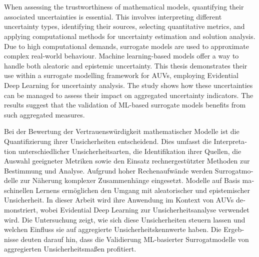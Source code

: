 \chapter{\abstractname}

When assessing the trustworthiness of mathematical models, quantifying their associated uncertainties is essential. This involves interpreting different uncertainty types, identifying their sources, selecting quantitative metrics, and applying computational methods for uncertainty estimation and solution analysis. Due to high computational demands, surrogate models are used to approximate complex real-world behaviour. Machine learning-based models offer a way to handle both aleatoric and epistemic uncertainty. This thesis demonstrates their use within a surrogate modelling framework for AUVs, employing Evidential Deep Learning for uncertainty analysis. The study shows how these uncertainties can be managed to assess their impact on aggregated uncertainty indicators. The results suggest that the validation of ML-based surrogate models benefits from such aggregated measures. \newline

\begin{otherlanguage}{ngerman}
Bei der Bewertung der Vertrauenswürdigkeit mathematischer Modelle ist die Quantifizierung ihrer Unsicherheiten entscheidend. Dies umfasst die Interpretation unterschiedlicher Unsicherheitsarten, die Identifikation ihrer Quellen, die Auswahl geeigneter Metriken sowie den Einsatz rechnergestützter Methoden zur Bestimmung und Analyse. Aufgrund hoher Rechenaufwände werden Surrogatmodelle zur Näherung komplexer Zusammenhänge eingesetzt. Modelle auf Basis maschinellen Lernens ermöglichen den Umgang mit aleatorischer und epistemischer Unsicherheit. In dieser Arbeit wird ihre Anwendung im Kontext von AUVs demonstriert, wobei Evidential Deep Learning zur Unsicherheitsanalyse verwendet wird. Die Untersuchung zeigt, wie sich diese Unsicherheiten steuern lassen und welchen Einfluss sie auf aggregierte Unsicherheitskennwerte haben. Die Ergebnisse deuten darauf hin, dass die Validierung ML-basierter Surrogatmodelle von aggregierten Unsicherheitsmaßen profitiert.
\end{otherlanguage}


